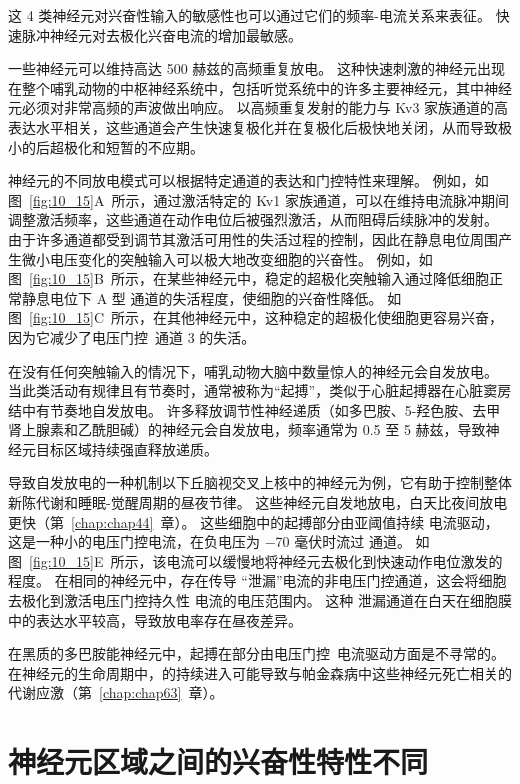 这 4 类神经元对兴奋性输入的敏感性也可以通过它们的频率-电流关系来表征。
快速脉冲神经元对去极化兴奋电流的增加最敏感。


一些神经元可以维持高达 500 赫兹的高频重复放电。
这种快速刺激的神经元出现在整个哺乳动物的中枢神经系统中，包括听觉系统中的许多主要神经元，其中神经元必须对非常高频的声波做出响应。
以高频重复发射的能力与 Kv3 家族通道的高表达水平相关，这些通道会产生快速复极化并在复极化后极快地关闭，从而导致极小的后超极化和短暂的不应期。


神经元的不同放电模式可以根据特定通道的表达和门控特性来理解。
例如，如图~\ref{fig:10_15}A~所示，通过激活特定的 Kv1 家族通道，可以在维持电流脉冲期间调整激活频率，这些通道在动作电位后被强烈激活，从而阻碍后续脉冲的发射。
由于许多通道都受到调节其激活可用性的失活过程的控制，因此在静息电位周围产生微小电压变化的突触输入可以极大地改变细胞的兴奋性。
例如，如图~\ref{fig:10_15}B~所示，在某些神经元中，稳定的超极化突触输入通过降低细胞正常静息电位下 A 型  通道的失活程度，使细胞的兴奋性降低。
如图~\ref{fig:10_15}C~所示，在其他神经元中，这种稳定的超极化使细胞更容易兴奋，因为它减少了电压门控~通道 3 的失活。


在没有任何突触输入的情况下，哺乳动物大脑中数量惊人的神经元会自发放电。
当此类活动有规律且有节奏时，通常被称为“起搏”，类似于心脏起搏器在心脏窦房结中有节奏地自发放电。
许多释放调节性神经递质（如多巴胺、5-羟色胺、去甲肾上腺素和乙酰胆碱）的神经元会自发放电，频率通常为 0.5 至 5 赫兹，导致神经元目标区域持续强直释放递质。


导致自发放电的一种机制以下丘脑视交叉上核中的神经元为例，它有助于控制整体新陈代谢和睡眠-觉醒周期的昼夜节律。
这些神经元自发地放电，白天比夜间放电更快（第~\ref{chap:chap44}~章）。 
这些细胞中的起搏部分由亚阈值持续  电流驱动，这是一种小的电压门控电流，在负电压为 −70 毫伏时流过  通道。
如图~\ref{fig:10_15}E~所示，该电流可以缓慢地将神经元去极化到快速动作电位激发的程度。
在相同的神经元中，存在传导 “泄漏”电流的非电压门控通道，这会将细胞去极化到激活电压门控持久性  电流的电压范围内。
这种  泄漏通道在白天在细胞膜中的表达水平较高，导致放电率存在昼夜差异。


在黑质的多巴胺能神经元中，起搏在部分由电压门控~电流驱动方面是不寻常的。
在神经元的生命周期中，的持续进入可能导致与帕金森病中这些神经元死亡相关的代谢应激（第~\ref{chap:chap63}~章）。



\section{神经元区域之间的兴奋性特性不同}


